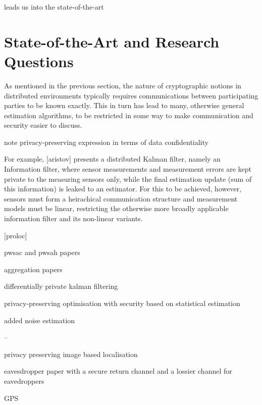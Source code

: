 leads us into the state-of-the-art

% 
%                                             
%                                             
%                                             
% 
\section{State-of-the-Art and Research Questions}

As mentioned in the previous section, the nature of cryptographic notions in distributed environments typically requires communications between participating parties to be known exactly. This in turn has lead to many, otherwise general estimation algorithms, to be restricted in some way to make communication and security easier to discuss.

note privacy-preserving expression in terms of data confidentiality

For example, [aristov] presents a distributed Kalman filter, namely an Information filter, where sensor measurements and measurement errors are kept private to the measuring sensors only, while the final estimation update (sum of this information) is leaked to an estimator. For this to be achieved, however, sensors must form a heirachical communication structure and measurement models must be linear, restricting the otherwise more broadly applicable information filter and its non-linear variants.

[proloc]

pwsac and pwsah papers

aggregation papers

differentially private kalman filtering

privacy-preserving optimisation with security based on statistical estimation

added noise estimation

--

privacy preserving image based localisation

eavesdropper paper with a secure return channel and a lossier channel for eavedroppers

GPS

